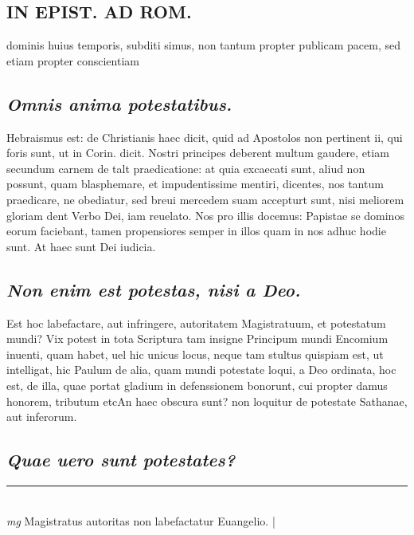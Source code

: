 \documentclass{article}
\begin{document}
\begin{pages}
\section*{IN EPIST. AD ROM.  }
\marginpar{[ p.149 ]}\pstart dominis huius temporis, subditi simus, non tantum propter publicam pacem, sed etiam propter conscientiam  \pend
{}
{}
\subsection*{\textit{Omnis anima potestatibus. }}\pstart Hebraismus est: de Christianis haec dicit, quid ad Apostolos non pertinent ii, qui foris sunt, ut in Corin. dicit. Nostri principes deberent multum gaudere, etiam secundum carnem de talt praedicatione: at quia excaecati sunt, aliud non possunt, quam blasphemare, et impudentissime mentiri, dicentes, nos tantum praedicare, ne obediatur, sed breui mercedem suam accepturt sunt, nisi meliorem gloriam dent Verbo Dei, iam reuelato. Nos pro illis docemus: Papistae se dominos eorum faciebant, tamen propensiores semper in illos quam in nos adhuc hodie sunt. At haec sunt Dei iudicia.  \pend
{}
{}
\subsection*{\textit{Non enim est potestas, nisi a Deo. }}\pstart Est hoc labefactare, aut infringere, autoritatem Magistratuum, et potestatum mundi? Vix potest in tota Scriptura tam insigne Principum mundi Encomium inuenti, quam habet, uel hic unicus locus, neque tam stultus quispiam est, ut intelligat, hic Paulum de alia, quam mundi potestate loqui, a Deo ordinata, hoc est, de illa, quae portat gladium in defenssionem bonorunt, cui propter damus honorem, tributum etcAn haec obscura sunt? non loquitur de potestate Sathanae, aut inferorum.   \pend
{}
{}
\subsection*{\textit{Quae uero sunt potestates? }}
\vspace{0.5cm}\noindent
\vspace{0.2cm}\rule{1cm}{0.2pt}\\ 
\hspace{0.2cm}\textit{mg}
\footnotesize Magistratus autoritas non labefactatur Euangelio.  
\normalsize| 

\end{pages}
\end{document}
